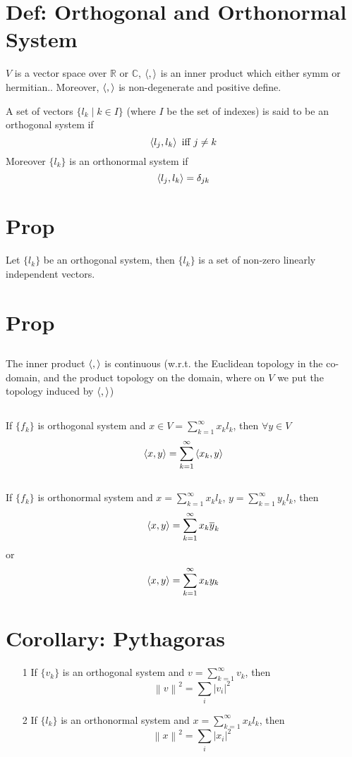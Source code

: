 \documentclass{book}
\newcommand{\abs}[1]{\left\lvert #1 \right\rvert}
\newcommand{\norm}[1]{\left\lVert #1 \right\rVert}
\begin{document}
\section{Def: Orthogonal and Orthonormal System}
$V$ is a vector space over $\mathbb{R}$ or $\mathbb{C}$, $\left<,\right>$ is an inner product which either symm or hermitian.. Moreover, $\left<,\right>$ is non-degenerate and positive define. 

A set of vectors $\{l_k\mid k\in I\}$ (where $I$ be the set of indexes) is said to be an orthogonal system if$$\left<l_j,l_k\right>\text{ iff } j\neq k$$
Moreover $\{l_k\}$ is an orthonormal system if$$\left<l_j,l_k\right>=\delta_{jk}$$
\section{Prop}
Let $\{l_k\}$ be an orthogonal system, then $\{l_k\}$ is a set of non-zero linearly independent vectors.

\section{Prop}
\subsection*{}The inner product $\left<,\right>$ is continuous (w.r.t. the Euclidean topology in the co-domain, and the product topology on the domain, where on $V$ we put the topology induced by $\left<,\right>$)
\subsection*{}If $\{f_k\}$ is orthogonal system and $x\in V=\sum\limits_{k=1}^\infty x_kl_k$, then $\forall y\in V$$$\left<x,y\right>=\sum\limits_{k=1}^\infty\left<x_k,y\right>$$
\subsection*{}If $\{f_k\}$ is orthonormal system and $ x=\sum\limits_{k=1}^\infty x_kl_k$, $y=\sum\limits_{k=1}^\infty y_kl_k$, then $$\left<x,y\right>=\sum\limits_{k=1}^\infty x_k\overline y_k$$or$$\left<x,y\right>=\sum\limits_{k=1}^\infty x_ky_k$$

\section{Corollary: Pythagoras}
\label{Pythagoras}
\begin{itemize}
    \item [1]If $\{v_k\}$ is an orthogonal system and $v=\sum\limits_{k=1}^\infty v_k$, then$$\norm{v}^2=\sum\limits_i\abs{v_i}^2$$
    \item [2]If $\{l_k\}$ is an orthonormal system and $x=\sum\limits_{k=1}^\infty x_kl_k$, then$$\norm{x}^2=\sum\limits_i\abs{x_i}^2$$
\end{itemize}
\end{document}

